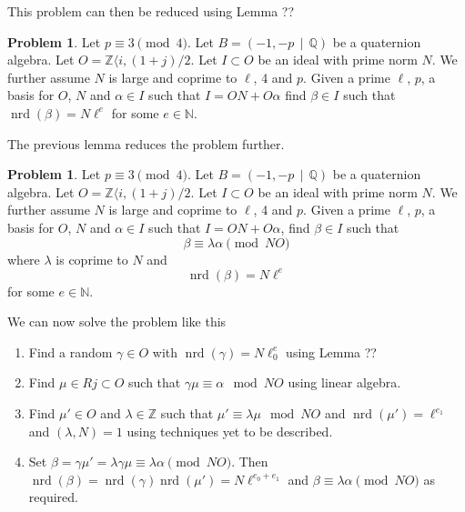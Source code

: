 \documentclass[10pt]{article}
\theoremstyle{plain}
\theoremstyle{definition}
\newtheorem{problem}[theorem]{Problem}
\newcommand{\op}{\operatorname}
\newcommand{\N}{\mathbb{N}}
\newcommand{\Z}{\mathbb{Z}}
\newcommand{\Q}{\mathbb{Q}}
\newcommand{\nrd}{\op{nrd}}
\begin{document}
This problem can then be reduced using Lemma ??

\begin{problem} \label{prob: ell power}
Let \( p \equiv 3 \pmod{4} \).
Let \( B =  (-1, -p \, \mid \, \Q) \) be a quaternion algebra.
Let \( O = \Z \langle i, (1+j) / 2 \).
Let \( I \subset O \) be an ideal with prime norm \( N \).
We further assume \( N \) is large and coprime to \( \ell \), 4 and \( p \).
Given a prime \( \ell \), \( p \), a basis for \( O \), \( N \) and \( \alpha \in I \) such that \( I = ON + O\alpha \) find \( \beta \in I \) such that \( \nrd(\beta) = N\ell^e \) for some \( e \in \N \).
\end{problem}


The previous lemma reduces the problem further.

\begin{problem} \label{prob: solve congruence}
Let \( p \equiv 3 \pmod{4} \).
Let \( B =  (-1, -p \, \mid \, \Q) \) be a quaternion algebra.
Let \( O = \Z \langle i, (1+j) / 2 \).
Let \( I \subset O \) be an ideal with prime norm \( N \).
We further assume \( N \) is large and coprime to \( \ell \), 4 and \( p \).
Given a prime \( \ell \), \( p \), a basis for \( O \), \( N \) and \( \alpha \in I \) such that \( I = ON + O\alpha \), find \( \beta \in I \) such that
\[
    \beta \equiv \lambda \alpha \pmod{NO}
\]
where \(\lambda \) is coprime to \( N \) and
\[
    \nrd(\beta) = N\ell^e
\]
for some \( e \in \N \).
\end{problem}

We can now solve the problem like this
\begin{enumerate}
    \item
          Find a random \( \gamma \in O \) with \( \nrd(\gamma) = N \ell^e_0 \) using Lemma ??
    \item
          Find \( \mu \in Rj \subset  O \) such that \( \gamma\mu \equiv \alpha \mod NO \) using linear algebra.
    \item
          Find \( \mu' \in  O \) and \( \lambda \in \Z \) such that \( \mu' \equiv \lambda \mu \mod NO \) and \( \nrd(\mu') = \ell^{e_1} \) and \( (\lambda, N) = 1 \) using techniques yet to be described.
    \item
          Set \( \beta = \gamma \mu' = \lambda\gamma\mu \equiv \lambda \alpha \pmod{NO} \). Then \( \nrd(\beta) = \nrd(\gamma)\nrd(\mu') = N\ell^{e_0 + e_1}\) and \( \beta \equiv \lambda \alpha \pmod{NO} \) as required.
\end{enumerate}
\end{document}
